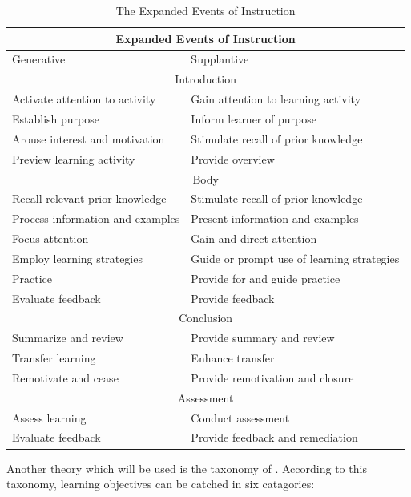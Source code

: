 \documentclass[12pt]{report} %
\begin{document}
\begin{table}
\begin{tabular}{| p{7cm} | p{7cm} |}
\hline
\multicolumn{2}{|c|}{Expanded Events of Instruction} \\ \hline
Generative & Supplantive \\ \hline
\multicolumn{2}{|c|}{Introduction} \\ \hline
Activate attention to activity & Gain attention to learning activity \\ \hline
Establish purpose & Inform learner of purpose \\ \hline
Arouse interest and motivation & Stimulate recall of prior knowledge \\ \hline
Preview learning activity & Provide overview \\ \hline
\multicolumn{2}{|c|}{Body} \\ \hline
Recall relevant prior knowledge & Stimulate recall of prior knowledge \\ \hline
Process information and examples & Present information and examples \\ \hline
Focus attention & Gain and direct attention \\ \hline
Employ learning strategies & Guide or prompt use of learning strategies \\ \hline
Practice & Provide for and guide practice \\ \hline
Evaluate feedback & Provide feedback \\ \hline
\multicolumn{2}{|c|}{Conclusion} \\ \hline
Summarize and review & Provide summary and review \\ \hline
Transfer learning & Enhance transfer \\ \hline
Remotivate and cease & Provide remotivation and closure \\ \hline
\multicolumn{2}{|c|}{Assessment} \\ \hline
Assess learning & Conduct assessment \\ \hline
Evaluate feedback & Provide feedback and remediation \\ \hline
\end{tabular}
\caption{\footnotesize The Expanded Events of Instruction \protect \cite{smithragan} \label{tab:eventsinstruction}}
\end{table}

Another theory which will be used is the taxonomy of . According to this taxonomy, learning objectives can be catched in six catagories:
\end{document}
